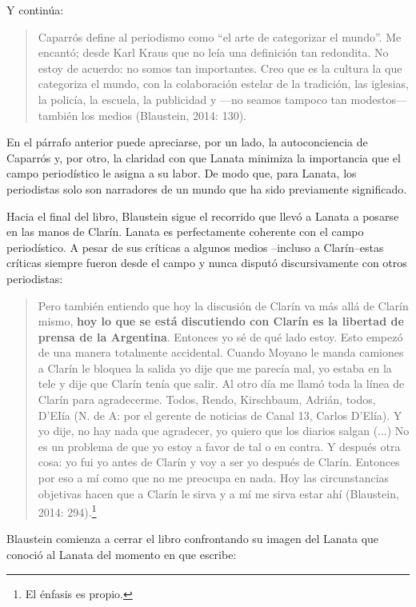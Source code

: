 Y continúa:

\begin{quote}
Caparrós define al periodismo como \enquote{el arte de categorizar el mundo}. Me encantó; desde Karl Kraus que no leía una definición tan redondita. No estoy de acuerdo: no somos tan importantes. Creo que es la cultura la que categoriza el mundo, con la colaboración estelar de la tradición, las iglesias, la policía, la escuela, la publicidad y ---no seamos tampoco tan modestos--- también los medios (Blaustein, 2014: 130).
\end{quote}

En el párrafo anterior puede apreciarse, por un lado, la autoconciencia de Caparrós y, por otro, la claridad con que Lanata minimiza la importancia que el campo periodístico le asigna a su labor. De modo que, para Lanata, los periodistas solo son narradores de un mundo que ha sido previamente significado.

Hacia el final del libro, Blaustein sigue el recorrido que llevó a Lanata a posarse en las manos de Clarín. Lanata es perfectamente coherente con el campo periodístico. A pesar de sus críticas a algunos medios --incluso a Clarín--estas críticas siempre fueron desde el campo y nunca disputó discursivamente con otros periodistas:

\begin{quote}
Pero también entiendo que hoy la discusión de Clarín va más allá de Clarín mismo, \textbf{hoy lo que se está discutiendo con Clarín es la libertad de prensa de la Argentina}. Entonces yo sé de qué lado estoy. Esto empezó de una manera totalmente accidental. Cuando Moyano le manda camiones a Clarín le bloquea la salida yo dije que me parecía mal, yo estaba en la tele y dije que Clarín tenía que salir. Al otro día me llamó toda la línea de Clarín para agradecerme. Todos, Rendo, Kirschbaum, Adrián, todos, D'EIía (N. de A: por el gerente de noticias de Canal 13, Carlos D'Elía). Y yo dije, no hay nada que agradecer, yo quiero que los diarios salgan (...) No es un problema de que yo estoy a favor de tal o en contra. Y después otra cosa: yo fui yo antes de Clarín y voy a ser yo después de Clarín. Entonces por eso a mí como que no me preocupa en nada. Hoy las circunstancias objetivas hacen que a Clarín le sirva y a mí me sirva estar ahí (Blaustein, 2014: 294).\footnote{El énfasis es propio.}
\end{quote}

Blaustein comienza a cerrar el libro confrontando su imagen del Lanata que conoció al Lanata del momento en que escribe:


